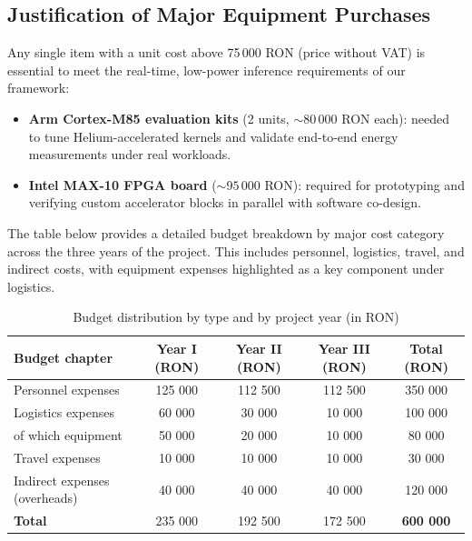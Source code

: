\subsection{Justification of Major Equipment Purchases}

Any single item with a unit cost above 75\,000 RON (price without VAT) is essential to meet the real-time, low-power inference requirements of our framework:

\begin{itemize}
  \item \textbf{Arm Cortex-M85 evaluation kits} (2 units, \(\sim80\,000\) RON each): needed to tune Helium-accelerated kernels and validate end-to-end energy measurements under real workloads.
  \item \textbf{Intel MAX-10 FPGA board} (\(\sim95\,000\) RON): required for prototyping and verifying custom accelerator blocks in parallel with software co-design.
\end{itemize}

The table below provides a detailed budget breakdown by major cost category across the three years of the project. This includes personnel, logistics, travel, and indirect costs, with equipment expenses highlighted as a key component under logistics.

\vspace{0.5\baselineskip}

\begin{table}[H]
  \centering
  \begin{tabular}{p{3.5cm} c c c c}
    \hline
    \textbf{Budget chapter} & \textbf{Year I (RON)} & \textbf{Year II (RON)} & \textbf{Year III (RON)} & \textbf{Total (RON)} \\
    \hline
    Personnel expenses            & 125 000 & 112 500 & 112 500 & 350 000 \\
    Logistics expenses            &  60 000 &  30 000 &  10 000 & 100 000 \\
    \quad of which equipment      &  50 000 &  20 000 &  10 000 &  80 000 \\
    Travel expenses               &  10 000 &  10 000 &  10 000 &  30 000 \\
    Indirect expenses (overheads) &  40 000 &  40 000 &  40 000 & 120 000 \\
    \hline
    \textbf{Total}                & 235 000 & 192 500 & 172 500 & \textbf{600 000} \\
    \hline
  \end{tabular}
  \caption{Budget distribution by type and by project year (in RON)}
  \label{tab:budget-RON}
\end{table}

